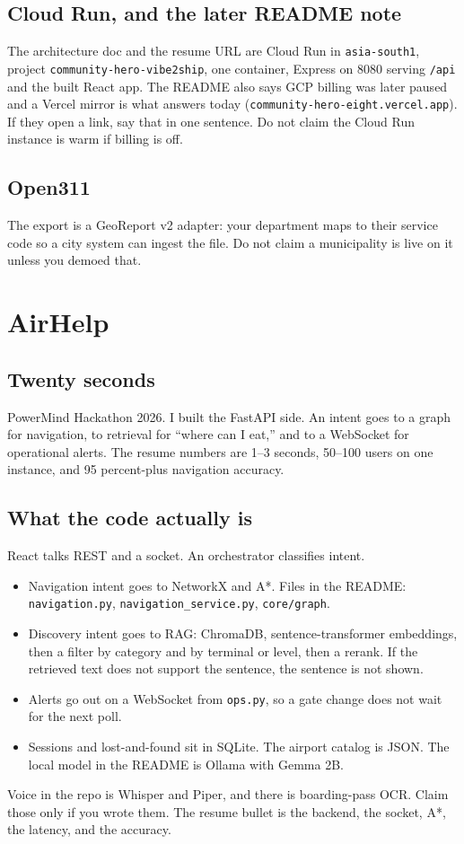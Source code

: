 \documentclass[a4paper,9.5pt]{extarticle}
\begin{document}
\subsection{Cloud Run, and the later README note}
The architecture doc and the resume URL are Cloud Run in \texttt{asia-south1}, project \texttt{community-hero-vibe2ship}, one container, Express on 8080 serving \texttt{/api} and the built React app. The README also says GCP billing was later paused and a Vercel mirror is what answers today (\texttt{community-hero-eight.vercel.app}). If they open a link, say that in one sentence. Do not claim the Cloud Run instance is warm if billing is off.

\subsection{Open311}
The export is a GeoReport v2 adapter: your department maps to their service code so a city system can ingest the file. Do not claim a municipality is live on it unless you demoed that.

\section{AirHelp}
\subsection{Twenty seconds}
PowerMind Hackathon 2026. I built the FastAPI side. An intent goes to a graph for navigation, to retrieval for ``where can I eat,'' and to a WebSocket for operational alerts. The resume numbers are 1--3 seconds, 50--100 users on one instance, and 95 percent-plus navigation accuracy.

\subsection{What the code actually is}
React talks REST and a socket. An orchestrator classifies intent.
\begin{itemize}
  \item Navigation intent goes to NetworkX and A*. Files in the README: \texttt{navigation.py}, \texttt{navigation\_service.py}, \texttt{core/graph}.
  \item Discovery intent goes to RAG: ChromaDB, sentence-transformer embeddings, then a filter by category and by terminal or level, then a rerank. If the retrieved text does not support the sentence, the sentence is not shown.
  \item Alerts go out on a WebSocket from \texttt{ops.py}, so a gate change does not wait for the next poll.
  \item Sessions and lost-and-found sit in SQLite. The airport catalog is JSON. The local model in the README is Ollama with Gemma 2B.
\end{itemize}
Voice in the repo is Whisper and Piper, and there is boarding-pass OCR. Claim those only if you wrote them. The resume bullet is the backend, the socket, A*, the latency, and the accuracy.
\end{document}
